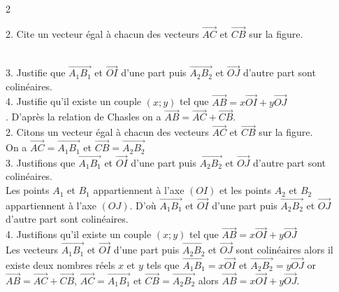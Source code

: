 \begin{multicols*}{2}
\begin{minipage}{4cm}
  		2. Cite un vecteur égal à chacun des vecteurs $\overrightarrow{AC}$ et $\overrightarrow{CB}$ sur la figure. 
  	\end{minipage}\\
  	3. Justifie que $\overrightarrow{A_1B_1}$ et $\overrightarrow{OI}$ d'une part puis $\overrightarrow{A_2B_2}$ et $\overrightarrow{OJ}$ d'autre part sont colinéaires. \\
  	4. Justifie qu'il existe un couple $ (x;y) $ tel que  $\overrightarrow{AB}=x\overrightarrow{OI}+ y\overrightarrow{OJ}$\\
  	\dure 
  	. D'après la relation de Chasles on a $\overrightarrow{AB}=\overrightarrow{AC} + \overrightarrow{CB}$. \\
  	2. Citons un vecteur égal à chacun des vecteurs $\overrightarrow{AC}$ et $\overrightarrow{CB}$ sur la figure.\\ On a $\overrightarrow{AC}=\overrightarrow{A_1B_1}$ et $\overrightarrow{CB}=\overrightarrow{A_2B_2}$\\
  	3. Justifions que $\overrightarrow{A_1B_1}$ et $\overrightarrow{OI}$ d'une part puis $\overrightarrow{A_2B_2}$ et $\overrightarrow{OJ}$ d'autre part sont colinéaires. \\
  	Les points $ A_1 $ et $ B_1 $ appartiennent à l'axe $ (OI) $ et les points $ A_2 $ et $ B_2 $ appartiennent à l'axe $ (OJ) $. D'où $\overrightarrow{A_1B_1}$ et $\overrightarrow{OI}$ d'une part puis $\overrightarrow{A_2B_2}$ et $\overrightarrow{OJ}$ d'autre part sont colinéaires.\\
  	4. Justifions qu'il existe un couple $ (x;y) $ tel que  $\overrightarrow{AB}=x\overrightarrow{OI}+ y\overrightarrow{OJ}$\\
  	Les vecteurs $\overrightarrow{A_1B_1}$ et $\overrightarrow{OI}$ d'une part puis $\overrightarrow{A_2B_2}$ et $\overrightarrow{OJ}$ sont colinéaires alors il existe deux nombres réels $x$ et $y$ tels que $\overrightarrow{A_1B_1} = x\overrightarrow{OI}$ et $\overrightarrow{A_2B_2} = y\overrightarrow{OJ}$ or $\overrightarrow{AB}=\overrightarrow{AC} + \overrightarrow{CB}$, $\overrightarrow{AC}=\overrightarrow{A_1B_1}$ et $\overrightarrow{CB}=\overrightarrow{A_2B_2}$ alors $\overrightarrow{AB}=x\overrightarrow{OI}+ y\overrightarrow{OJ}$.

\end{multicols*}
